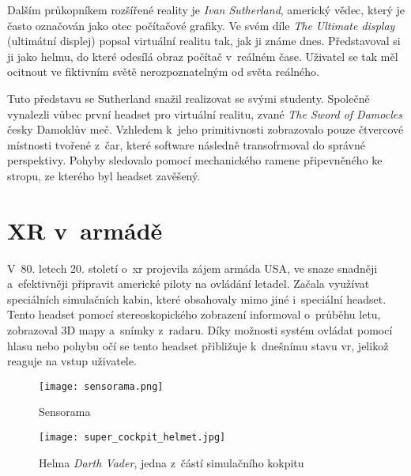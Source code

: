 Dalším průkopníkem rozšířené reality je \textit{Ivan Sutherland}, americký vědec, který je často označován jako otec počítačové grafiky. Ve svém díle \textit{The Ultimate display} (ultimátní displej) popsal virtuální realitu tak, jak ji známe dnes. Představoval si ji jako helmu, do které odesílá obraz počítač v~reálném čase. Uživatel se tak měl ocitnout ve fiktivním světě nerozpoznatelným od světa reálného. \cite{otechnice} \cite{ivan_sutherland_bio}

Tuto představu se Sutherland snažil realizovat se svými studenty. Společně vynalezli vůbec první headset pro virtuální realitu, zvané \textit{The Sword of Damocles} \poml česky Damoklův meč. Vzhledem k~jeho primitivnosti zobrazovalo pouze čtvercové místnosti tvořené z~čar, které software následně transofrmoval do správné perspektivy. Pohyby sledovalo pomocí mechanického ramene připevněného ke stropu, ze kterého byl headset zavěšený. \cite{otechnice} \cite{Rheingold_1992}

\section{XR v~armádě}

V~80. letech 20. století o~\gls{xr} projevila zájem armáda USA, ve snaze snadněji a~efektivněji připravit americké piloty na ovládání letadel. Začala využívat speciálních simulačních kabin, které obsahovaly mimo jiné i~speciální headset. Tento headset pomocí stereoskopického zobrazení informoval o~průběhu letu, zobrazoval 3D mapy a~snímky z~radaru. Díky možnosti systém ovládat pomocí hlasu nebo pohybu očí se tento headset přibližuje k~dnešnímu stavu \gls{vr}, jelikož reaguje na vstup uživatele. \cite{otechnice}


\begin{figure}[H]
    \centering

    \begin{minipage}{.5\textwidth}
        \centering
        \texttt{[image: sensorama.png]}
        \caption{Sensorama \cite{sensorama_patent}}
        \label{sensorama_fig}
    \end{minipage}%
    \begin{minipage}{.5\textwidth}
        \centering
        \texttt{[image: super\_cockpit\_helmet.jpg]}
        \caption{Helma \textit{Darth Vader}, jedna z~částí simulačního kokpitu \cite{super_cockpit_image}}
        \label{sensorama}
    \end{minipage}

\end{figure}

